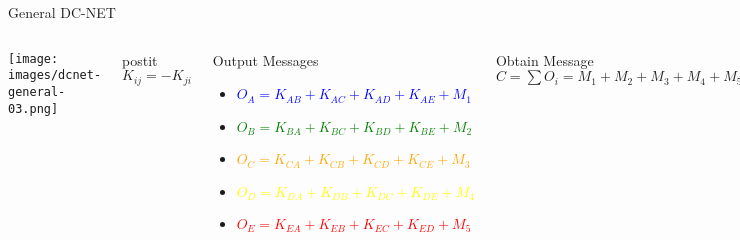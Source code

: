 \begin{frame}{General DC-NET}

\begin{columns}[c]
    \centering
    \texttt{[image: images/dcnet-general-03.png]}
    \vspace{.5cm}
    \begin{beamercolorbox}[sep=1em,wd=3cm,center]{postit}
        $K_{ij} = -K_{ji}$
    \end{beamercolorbox}
    \centering
    \begin{block}{Output Messages}
      \footnotesize
      \begin{itemize}
      \setlength{\itemindent}{-.25in}
          \item[] \textcolor{blue}{$O_A = K_{AB} + K_{AC} + K_{AD} + K_{AE} + M_1$}
          \item[] \textcolor{green}{$O_B = K_{BA} + K_{BC} + K_{BD} + K_{BE} + M_2$}
          \item[] \textcolor{orange}{$O_C = K_{CA} + K_{CB} + K_{CD} + K_{CE} + M_3$}
          \item[] \textcolor{yellow}{$O_D = K_{DA} + K_{DB} + K_{DC} + K_{DE} + M_4$}
          \item[] \textcolor{red}{$O_E = K_{EA} + K_{EB} + K_{EC} + K_{ED} + M_5$}
      \end{itemize}
    \end{block}
    
    \begin{exampleblock}{Obtain Message}
    \centering
    $C = \sum O_i = M_1 + M_2 + M_3 + M_4 + M_5$
    \end{exampleblock}
\end{columns}

\end{frame}